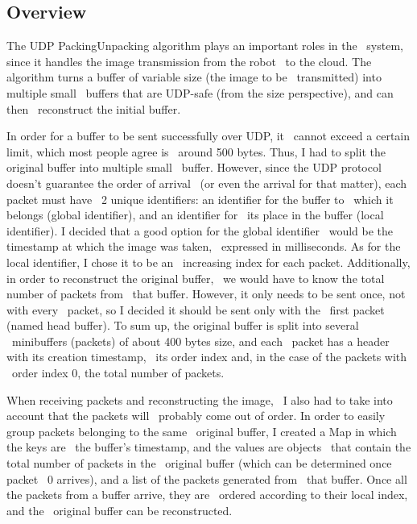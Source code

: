 \subsection{Overview}
\label{subsec:udp-pack-overview}

The UDP Packing\-Unpacking algorithm plays an important roles in the \
system, since it handles the image transmission from the robot \
to the cloud.
The algorithm turns a buffer of variable size (the image to be \
transmitted) into multiple small \
buffers that are UDP-safe (from the size perspective), and can then \
reconstruct the initial buffer.

In order for a buffer to be sent successfully over UDP, it \
cannot exceed a certain limit, which most people agree is \
around 500 bytes.
Thus, I had to split the original buffer into multiple small \
buffer.
However, since the UDP protocol doesn't guarantee the order of arrival \
(or even the arrival for that matter), each packet must have \
2 unique identifiers: an identifier for the buffer to \
which it belongs (global identifier), and an identifier for \
its place in the buffer (local identifier).
I decided that a good option for the global identifier \
would be the timestamp at which the image was taken, \
expressed in milliseconds.
As for the local identifier, I chose it to be an \
increasing index for each packet.
Additionally, in order to reconstruct the original buffer, \
we would have to know the total number of packets from \
that buffer.
However, it only needs to be sent once, not with every \
packet, so I decided it should be sent only with the \
first packet (named head buffer).
To sum up, the original buffer is split into several \
mini\-buffers (packets) of about 400 bytes size, and each \
packet has a header with its creation timestamp, \
its order index and, in the case of the packets with \
order index 0, the total number of packets.

When receiving packets and reconstructing the image, \
I also had to take into account that the packets will \
probably come out of order.
In order to easily group packets belonging to the same \
original buffer, I created a Map in which the keys are \
the buffer's timestamp, and the values are objects \
that contain the total number of packets in the \
original buffer (which can be determined once packet \
0 arrives), and a list of the packets generated from \
that buffer.
Once all the packets from a buffer arrive, they are \
ordered according to their local index, and the \
original buffer can be reconstructed.


